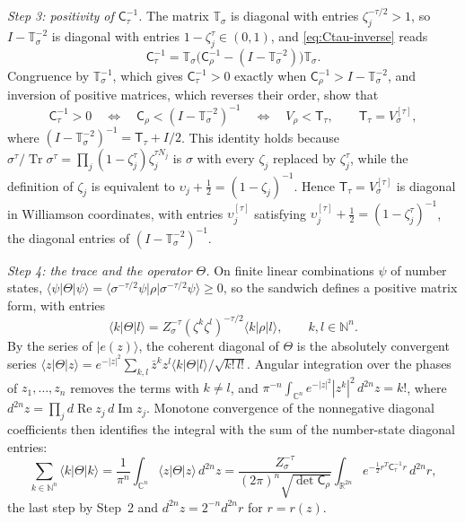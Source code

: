 \documentclass[11pt]{amsart}
\numberwithin{equation}{section}
\theoremstyle{definition}
\newcommand{\R}{\mathbb R}
\newcommand{\C}{\mathbb C}
\newcommand{\N}{\mathbb N}
\newcommand{\Tr}{\operatorname{Tr}}
\newcommand{\Rea}{\operatorname{Re}}
\newcommand{\Ima}{\operatorname{Im}}
\begin{document}
\smallskip
\emph{Step 3: positivity of \(\mathsf C_\tau^{-1}\).} The matrix
\(\mathbb T_\sigma\) is diagonal with entries \(\zeta_j^{-\tau/2}>1\),
so \(I-\mathbb T_\sigma^{-2}\) is diagonal with entries
\(1-\zeta_j^\tau\in(0,1)\), and \eqref{eq:Ctau-inverse} reads
\[
 \mathsf C_\tau^{-1}
 =\mathbb T_\sigma\bigl(\mathsf C_\rho^{-1}-(I-\mathbb T_\sigma^{-2})\bigr)
  \mathbb T_\sigma .
\]
Congruence by \(\mathbb T_\sigma^{-1}\), which gives
\(\mathsf C_\tau^{-1}>0\) exactly when
\(\mathsf C_\rho^{-1}>I-\mathbb T_\sigma^{-2}\), and inversion of
positive matrices, which reverses their order, show that
\begin{equation}
 \mathsf C_\tau^{-1}>0
 \quad\Longleftrightarrow\quad
 \mathsf C_\rho<(I-\mathbb T_\sigma^{-2})^{-1}
 \quad\Longleftrightarrow\quad
 V_\rho<\mathsf T_\tau,\qquad
 \mathsf T_\tau=V_\sigma^{[\tau]},
 \label{eq:gaussian-domain}
\end{equation}
where
\((I-\mathbb T_\sigma^{-2})^{-1}=\mathsf T_\tau+I/2\). This identity
holds because
\(\sigma^\tau/{\Tr\sigma^\tau}=\prod_j(1-\zeta_j^\tau)\zeta_j^{\tau N_j}\)
is \(\sigma\) with every \(\zeta_j\) replaced by \(\zeta_j^\tau\), while
the definition of \(\zeta_j\) is equivalent to
\(\upsilon_j+\tfrac12=(1-\zeta_j)^{-1}\). Hence
\(\mathsf T_\tau=V_\sigma^{[\tau]}\) is diagonal in Williamson coordinates,
with entries \(\upsilon_j^{[\tau]}\) satisfying
\(\upsilon_j^{[\tau]}+\tfrac12=(1-\zeta_j^\tau)^{-1}\), the diagonal
entries of \((I-\mathbb T_\sigma^{-2})^{-1}\).

\smallskip
\emph{Step 4: the trace and the operator \(\Theta\).} On finite
linear combinations \(\psi\) of number states,
\(\langle\psi|\Theta|\psi\rangle
=\langle\sigma^{-\tau/2}\psi|\rho|\sigma^{-\tau/2}\psi\rangle\ge0\), so
the sandwich defines a positive matrix form, with entries
\[
 \langle k|\Theta|l\rangle
 =Z_\sigma^{-\tau}(\zeta^k\zeta^l)^{-\tau/2}\langle k|\rho|l\rangle,
 \qquad k,l\in\N^n .
\]
By the series of \(|e(z)\rangle\), the coherent diagonal of \(\Theta\)
is the absolutely convergent series
\(\langle z|\Theta|z\rangle
=e^{-|z|^2}\sum_{k,l}\bar z^kz^l\langle k|\Theta|l\rangle/\sqrt{k!\,l!}\).
Angular integration over the phases of \(z_1,\ldots,z_n\) removes the
terms with \(k\ne l\), and
\(\pi^{-n}\int_{\C^n}e^{-|z|^2}|z^k|^2\,d^{2n}z=k!\), where
\(d^{2n}z=\prod_jd\Rea z_j\,d\Ima z_j\). Monotone convergence of the
nonnegative diagonal coefficients then identifies the integral with the
sum of the number-state diagonal entries:
\[
 \sum_{k\in\N^n}\langle k|\Theta|k\rangle
 =\frac1{\pi^n}\int_{\C^n}\langle z|\Theta|z\rangle\,d^{2n}z
 =\frac{Z_\sigma^{-\tau}}{(2\pi)^n\sqrt{\det\mathsf C_\rho}}
  \int_{\R^{2n}}e^{-\frac12r^T\mathsf C_\tau^{-1}r}\,d^{2n}r ,
\]
the last step by Step~2 and \(d^{2n}z=2^{-n}d^{2n}r\) for \(r=r(z)\).
\end{document}

